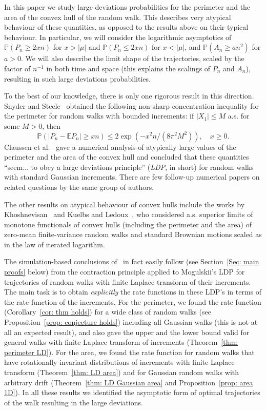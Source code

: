 \documentclass[10pt]{amsart}
\theoremstyle{definition}\newtheorem{defi}[theo]{Definition}\newtheorem{rema}[theo]{Remark}\newtheorem{exam}[theo]{Example}\newtheorem{exem}[theo]{Example}\newtheorem{nota}[theo]{Notation}
\newcommand{\E}{\mathbb{E}}
\newcommand{\Pbb}{\mathbb{P}}
\begin{document}
In this paper we study large deviations probabilities for the perimeter and the area of the convex hull of the random walk. This describes very atypical behaviour of these quantities, as opposed to the results above on their typical behaviour. In particular, we will consider the logarithmic asymptotics of $\Pbb(P_n \ge 2 x n)$ for $x> |\mu|$ and $\Pbb(P_n \le 2 x n)$ for $x<|\mu|$, and $\Pbb(A_n \ge a n^2)$ for $a > 0$. We will also describe the limit shape of the trajectories, scaled by the factor of $n^{-1}$ in both time and space (this explains the scalings of $P_n$ and $A_n$), resulting in such large deviations probabilities.

To the best of our knowledge, there is only one rigorous result in this direction. Snyder and Steele~\cite{SnyderSteele} obtained the following non-sharp concentration inequality for the perimeter for random walks with bounded increments: if $|X_1| \le M$ a.s. for some $M >0$, then
\[
\Pbb(|P_n - \E P_n| \ge xn) \le 2\exp\left(- x^2 n/\left(8 \pi^2 M^2\right)\right), \quad x \ge 0.
\]
Claussen et al.~\cite{Claussen+} gave a numerical analysis of atypically large values of the perimeter and the area of the convex hull and concluded that these quantities ``seem... to obey a large deviations principle'' (\emph{LDP}, in short) for random walks with standard Gaussian increments. There are few follow-up numerical papers on related questions by the same group of authors.

The other results on atypical behaviour of convex hulls include the works by Khoshnevisan~\cite{Khoshnevisan} and Kuelbs and Ledoux~\cite{KuelbsLedoux}, who considered a.s. superior limits of monotone functionals of convex hulls (including the perimeter and the area) of zero-mean finite-variance random walks and standard Brownian motions scaled as in the law of iterated logarithm.



The simulation-based conclusions of~\cite{Claussen+} in fact easily follow (see Section~\ref{Sec: main proofs} below) from the contraction principle applied to Mogulskii's LDP for trajectories of random walks with finite Laplace transform of their increments. The main task is to obtain \emph{explicitly} the rate functions in these LDP's in terms of the rate function of the increments. For the perimeter, we found the rate function (Corollary~\ref{cor: thm holds}) for a wide class of random walks (see Proposition~\ref{prop: conjecture holds}) including all Gaussian walks (this is not at all an expected result), and also gave the upper and the lower bound valid for general walks with finite Laplace transform of increments (Theorem~\ref{thm: perimeter LD}). For the area, we found the rate function for random walks that have rotationally invariant distributions of increments with finite Laplace transform (Theorem~\ref{thm: LD area}) and for Gaussian random walks with arbitrary drift (Theorem~\ref{thm: LD Gaussian area} and Proposition~\ref{prop: area 1D}). In all these results we identified the asymptotic form of optimal trajectories of the walk resulting in the large deviations.
\end{document}

